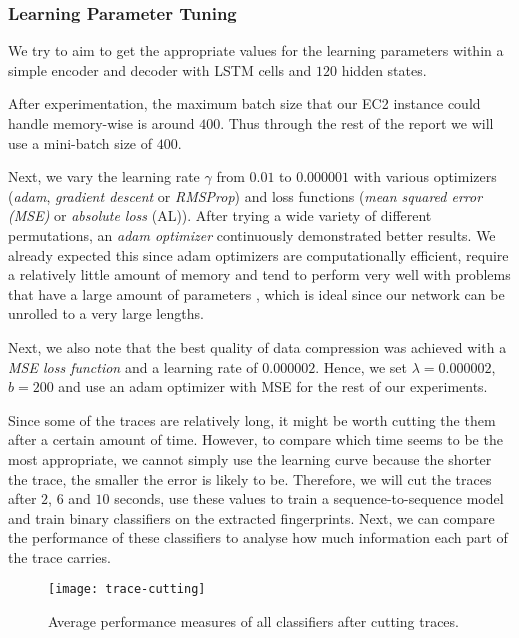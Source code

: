 \subsubsection{Learning Parameter Tuning}

We try to aim to get the appropriate values for the learning parameters within a simple encoder and decoder with LSTM cells and $120$ hidden states.

After experimentation, the maximum batch size that our EC2 instance could handle memory-wise is around $400$.
Thus through the rest of the report we will use a mini-batch size of $400$.

Next, we vary the learning rate $\gamma$ from $0.01$ to $0.000001$ with various optimizers (\textit{adam}, \textit{gradient descent} or \textit{RMSProp}) and loss functions (\textit{mean squared error (MSE)} or \textit{absolute loss} (AL)).
After trying a wide variety of different permutations, an \textit{adam optimizer} continuously demonstrated better results.
We already expected this since adam optimizers are computationally efficient, require a relatively little amount of memory and tend to perform very well with problems that have a large amount of parameters \cite{kingma2014adam},
which is ideal since our network can be unrolled to a very large lengths.

Next, we also note that the best quality of data compression was achieved with a \textit{MSE loss function} and a learning rate of $0.000002$.
Hence, we set $\lambda = 0.000002$, $b = 200$ and use an adam optimizer with MSE for the rest of our experiments.

Since some of the traces are relatively long, it might be worth cutting the them after a certain amount of time.
However, to compare which time seems to be the most appropriate, we cannot simply use the learning curve because the shorter the trace, the smaller the error is likely to be.
Therefore, we will cut the traces after $2$, $6$ and $10$ seconds, use these values to train a sequence-to-sequence model and train binary classifiers on the extracted fingerprints.
Next, we can compare the performance of these classifiers to analyse how much information each part of the trace carries.

\begin{figure}[ht]
  \centering
  \texttt{[image: trace-cutting]}
  \caption{Average performance measures of all classifiers after cutting traces.}
  \label{fig:trace-cutting}
\end{figure}


